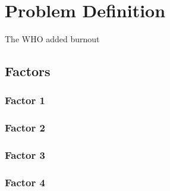 \chapter{Problem Definition}

The WHO added burnout 

\section{Factors}

\subsection{Factor 1}
\subsection{Factor 2}
\subsection{Factor 3}
\subsection{Factor 4}